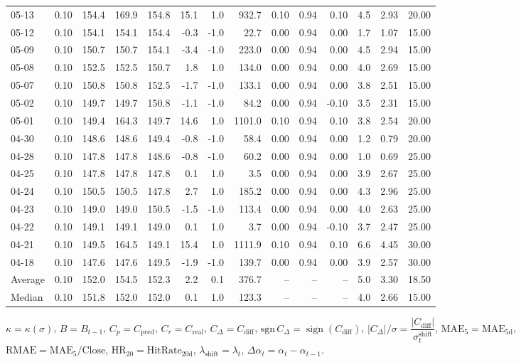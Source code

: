 \begin{threeparttable}
{\begin{tabular}{lrrrrrrrrrrrrr}
05-13 & 0.10 & 154.4 & 169.9 & 154.8 & 15.1 & 1.0 & 932.7 & 0.10 & 0.94 & 0.10 & 4.5 & 2.93 & 20.00 \\
05-12 & 0.10 & 154.1 & 154.1 & 154.4 & -0.3 & -1.0 & 22.7 & 0.00 & 0.94 & 0.00 & 1.7 & 1.07 & 15.00 \\
05-09 & 0.10 & 150.7 & 150.7 & 154.1 & -3.4 & -1.0 & 223.0 & 0.00 & 0.94 & 0.00 & 4.5 & 2.94 & 15.00 \\
05-08 & 0.10 & 152.5 & 152.5 & 150.7 & 1.8 & 1.0 & 134.0 & 0.00 & 0.94 & 0.00 & 4.0 & 2.69 & 15.00 \\
05-07 & 0.10 & 150.8 & 150.8 & 152.5 & -1.7 & -1.0 & 133.1 & 0.00 & 0.94 & 0.00 & 3.8 & 2.51 & 15.00 \\
05-02 & 0.10 & 149.7 & 149.7 & 150.8 & -1.1 & -1.0 & 84.2 & 0.00 & 0.94 & -0.10 & 3.5 & 2.31 & 15.00 \\
05-01 & 0.10 & 149.4 & 164.3 & 149.7 & 14.6 & 1.0 & 1101.0 & 0.10 & 0.94 & 0.10 & 3.8 & 2.54 & 20.00 \\
04-30 & 0.10 & 148.6 & 148.6 & 149.4 & -0.8 & -1.0 & 58.4 & 0.00 & 0.94 & 0.00 & 1.2 & 0.79 & 20.00 \\
04-28 & 0.10 & 147.8 & 147.8 & 148.6 & -0.8 & -1.0 & 60.2 & 0.00 & 0.94 & 0.00 & 1.0 & 0.69 & 25.00 \\
04-25 & 0.10 & 147.8 & 147.8 & 147.8 & 0.1 & 1.0 & 3.5 & 0.00 & 0.94 & 0.00 & 3.9 & 2.67 & 25.00 \\
04-24 & 0.10 & 150.5 & 150.5 & 147.8 & 2.7 & 1.0 & 185.2 & 0.00 & 0.94 & 0.00 & 4.3 & 2.96 & 25.00 \\
04-23 & 0.10 & 149.0 & 149.0 & 150.5 & -1.5 & -1.0 & 113.4 & 0.00 & 0.94 & 0.00 & 4.0 & 2.63 & 25.00 \\
04-22 & 0.10 & 149.1 & 149.1 & 149.0 & 0.1 & 1.0 & 3.7 & 0.00 & 0.94 & -0.10 & 3.7 & 2.47 & 25.00 \\
04-21 & 0.10 & 149.5 & 164.5 & 149.1 & 15.4 & 1.0 & 1111.9 & 0.10 & 0.94 & 0.10 & 6.6 & 4.45 & 30.00 \\
04-18 & 0.10 & 147.6 & 147.6 & 149.5 & -1.9 & -1.0 & 139.7 & 0.00 & 0.94 & 0.00 & 3.9 & 2.57 & 30.00 \\
Average & 0.10 & 152.0 & 154.5 & 152.3 & 2.2 & 0.1 & 376.7 & -- & -- & -- & 5.0 & 3.30 & 18.50 \\
Median & 0.10 & 151.8 & 152.0 & 152.0 & 0.1 & 1.0 & 123.3 & -- & -- & -- & 4.0 & 2.66 & 15.00 \\
\bottomrule
\end{tabular}
}%
\begin{tablenotes}\footnotesize
\item $\kappa=\kappa(\sigma)$, $B=B_{t-1}$, $C_p=C_{\text{pred}}$, $C_r=C_{\text{real}}$, $C_\Delta=C_{\text{diff}}$, $\mathrm{sgn}\,C_\Delta=\operatorname{sign}(C_{\text{diff}})$, $|C_\Delta|/\sigma=\dfrac{|C_{\text{diff}}|}{\sigma_t^{\text{shift}}}$, $\mathrm{MAE}_5=\mathrm{MAE}_{5\text{d}}$, $\mathrm{RMAE}= \mathrm{MAE}_5 / \text{Close}$, $\mathrm{HR}_{20}=\mathrm{HitRate}_{20\text{d}}$, 
$\lambda_{\text{shift}}=\lambda_t$, 
$\Delta\alpha_t=\alpha_t-\alpha_{t-1}$.
\end{tablenotes}
\end{threeparttable}
\endgroup